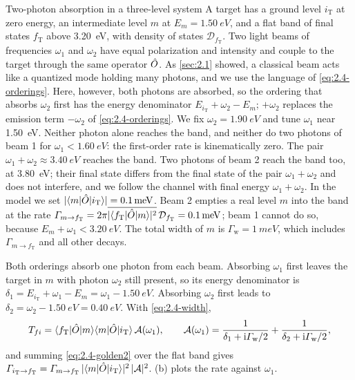 \begin{workedexample}{Two-photon absorption in a three-level system}\label{we:2-twophoton}
A target has a ground level $i_{\mathrm{T}}$ at zero energy, an intermediate level $m$ at $E_m = \SI{1.50}{eV}$, and a flat band of final states $f_{\mathrm{T}}$ above \SI{3.20}{eV}, with density of states $\mathcal{D}_{f_{\mathrm{T}}}$. Two light beams of frequencies $\omega_1$ and $\omega_2$ have equal polarization and intensity and couple to the target through the same operator $\hat{O}$. As \cref{sec:2.1} showed, a classical beam acts like a quantized mode holding many photons, and we use the language of \cref{eq:2.4-orderings}. Here, however, both photons are absorbed, so the ordering that absorbs $\omega_2$ first has the energy denominator $E_{i_{\mathrm{T}}} + \omega_2 - E_m$; $+\omega_2$ replaces the emission term $-\omega_2$ of \cref{eq:2.4-orderings}. We fix $\omega_2 = \SI{1.90}{eV}$ and tune $\omega_1$ near \SI{1.50}{eV}. Neither photon alone reaches the band, and neither do two photons of beam 1 for $\omega_1 < \SI{1.60}{eV}$: the first-order rate is kinematically zero. The pair $\omega_1 + \omega_2 \approx \SI{3.40}{eV}$ reaches the band. Two photons of beam 2 reach the band too, at \SI{3.80}{eV}; their final state differs from the final state of the pair $\omega_1 + \omega_2$ and does not interfere, and we follow the channel with final energy $\omega_1 + \omega_2$. In the model we set $|\langle m|\hat{O}|i_{\mathrm{T}}\rangle| = \SI{0.1}{meV}$. Beam 2 empties a real level $m$ into the band at the rate $\varGamma_{m\to f_{\mathrm{T}}} = 2\pi\overline{|\langle f_{\mathrm{T}}|\hat{O}|m\rangle|^2}\,\mathcal{D}_{f_{\mathrm{T}}} = \SI{0.1}{meV}$; beam 1 cannot do so, because $E_m + \omega_1 < \SI{3.20}{eV}$. The total width of $m$ is $\varGamma_{\mathrm{w}} = \SI{1}{meV}$, which includes $\varGamma_{m\to f_{\mathrm{T}}}$ and all other decays.

Both orderings absorb one photon from each beam. Absorbing $\omega_1$ first leaves the target in $m$ with photon $\omega_2$ still present, so its energy denominator is $\delta_1 = E_{i_{\mathrm{T}}} + \omega_1 - E_m = \omega_1 - \SI{1.50}{eV}$. Absorbing $\omega_2$ first leads to $\delta_2 = \omega_2 - \SI{1.50}{eV} = \SI{0.40}{eV}$. With \cref{eq:2.4-width},
\begin{equation*}
  T_{fi} = \langle f_{\mathrm{T}}|\hat{O}|m\rangle\langle m|\hat{O}|i_{\mathrm{T}}\rangle\,\mathcal{A}(\omega_1), \qquad
  \mathcal{A}(\omega_1) = \frac{1}{\delta_1 + \mathrm{i}\varGamma_{\mathrm{w}}/2} + \frac{1}{\delta_2 + \mathrm{i}\varGamma_{\mathrm{w}}/2} ,
\end{equation*}
and summing \cref{eq:2.4-golden2} over the flat band gives $\varGamma_{i_{\mathrm{T}}\to f_{\mathrm{T}}} = \varGamma_{m\to f_{\mathrm{T}}}\,|\langle m|\hat{O}|i_{\mathrm{T}}\rangle|^2\,|\mathcal{A}|^2$. (b) plots the rate against $\omega_1$.


\end{workedexample}
